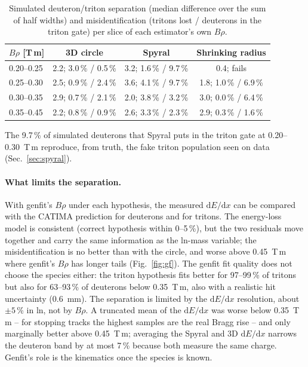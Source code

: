 \documentclass[11pt,a4paper]{article}
\newcommand{\brho}{$B\rho$}
\newcommand{\dedx}{$\mathrm{d}E/\mathrm{d}x$}
\begin{document}
\begin{table}[htbp]
  \centering
  \caption{Simulated deuteron/triton separation (median difference over the sum of half widths) and
  misidentification (tritons lost / deuterons in the triton gate) per slice of each estimator's own \brho.}
  \label{tab:dtsim}
  \begin{tabular}{lccc}
    \toprule
    \brho{} [T\,m] & 3D circle & Spyral & Shrinking radius \\
    \midrule
    0.20--0.25 & 2.2; 3.0\,\% / 0.5\,\% & 3.2; 1.6\,\% / 9.7\,\% & 0.4; fails \\
    0.25--0.30 & 2.5; 0.9\,\% / 2.4\,\% & 3.6; 4.1\,\% / 9.7\,\% & 1.8; 1.0\,\% / 6.9\,\% \\
    0.30--0.35 & 2.9; 0.7\,\% / 2.1\,\% & 2.0; 3.8\,\% / 3.2\,\% & 3.0; 0.0\,\% / 6.4\,\% \\
    0.35--0.45 & 2.2; 0.8\,\% / 0.9\,\% & 2.6; 3.3\,\% / 2.3\,\% & 2.9; 0.3\,\% / 1.6\,\% \\
    \bottomrule
  \end{tabular}
\end{table}

The 9.7\,\% of simulated deuterons that Spyral puts in the triton gate at 0.20--0.30~T\,m reproduce, from truth, the
fake triton population seen on data (Sec.~\ref{sec:spyral}).

\paragraph{What limits the separation.} With genfit's \brho{} under each hypothesis, the measured \dedx{} can be
compared with the CATIMA prediction for deuterons and for tritons. The energy-loss model is consistent (correct
hypothesis within 0--5\,\%), but the two residuals move together and carry the same information as the ln-mass
variable; the misidentification is no better than with the circle, and worse above 0.45~T\,m where genfit's \brho{}
has longer tails (Fig.~\ref{fig:gf}). The genfit fit quality does not choose the species either: the triton
hypothesis fits better for 97--99\,\% of tritons but also for 63--93\,\% of deuterons below 0.35~T\,m, also with a
realistic hit uncertainty (0.6~mm). The separation is limited by the \dedx{} resolution, about $\pm5$\,\% in ln,
not by \brho. A truncated mean of the \dedx{} was worse below 0.35~T\,m -- for stopping tracks the highest samples
are the real Bragg rise -- and only marginally better above 0.45~T\,m; averaging the Spyral and 3D \dedx{} narrows the
deuteron band by at most 7\,\% because both measure the same charge. Genfit's role is the kinematics once the
species is known.
\end{document}
